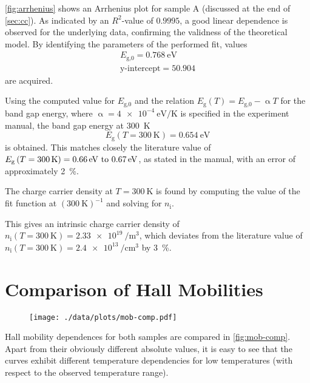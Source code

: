 \autoref{fig:arrhenius} shows an Arrhenius plot for sample A (discussed at the end of \autoref{sec:cc}).
As indicated by an $R^2$-value of $0.9995$, a good linear dependence is observed for the underlying data, confirming the validness of the theoretical model.
By identifying the parameters of the performed fit, values
\begin{align*}
	E_\text{g,0} = \SI{0.768}{\eV} \\
	\text{y-intercept} = \num{50.904} %
\end{align*}
are acquired.

Using the computed value for $E_\text{g,0}$ and the relation $E_\text{g}(T) = E_\text{g,0} -\upalpha T$ for the band gap energy, where $\upalpha=\SI{4e-4}{\eV\per\kelvin}$ is specified in the experiment manual, the band gap energy at \SI{300}{\kelvin}
\begin{equation*}
	E_\text{g}\left(T = \SI{300}{\kelvin}\right) = \SI{0.654}{\eV}
\end{equation*}
is obtained.
This matches closely the literature value of $E_\text{g}\left(T = \SI{300}{\kelvin}\right) = \text{\SIrange{0.66}{0.67}{\eV}}$, as stated in the manual, with an error of approximately \SI{2}{\percent}.

The charge carrier density at $T = \SI{300}{\kelvin}$ is found by computing the value of the fit function at $\left(\SI{300}{\kelvin}\right)^{-1}$ and solving for $n_\text{i}$.

This gives an intrinsic charge carrier density of $n_\text{i} (T=\SI{300}{\kelvin}) = \SI{2.33e19}{\per\meter\cubed}$, which deviates from the literature value of $n_\text{i} (T=\SI{300}{\kelvin}) = \SI{2.4e13}{\per\centi\meter\cubed}$ by \SI{3}{\percent}.

\section{Comparison of Hall Mobilities}
\begin{figure}
  \centering
  \texttt{[image: ./data/plots/mob-comp.pdf]}
  \label{fig:mob-comp}
\end{figure}

Hall mobility dependences for both samples are compared in \autoref{fig:mob-comp}.
Apart from their obviously different absolute values, it is easy to see that the curves exhibit different temperature dependencies for low temperatures (with respect to the observed temperature range).

